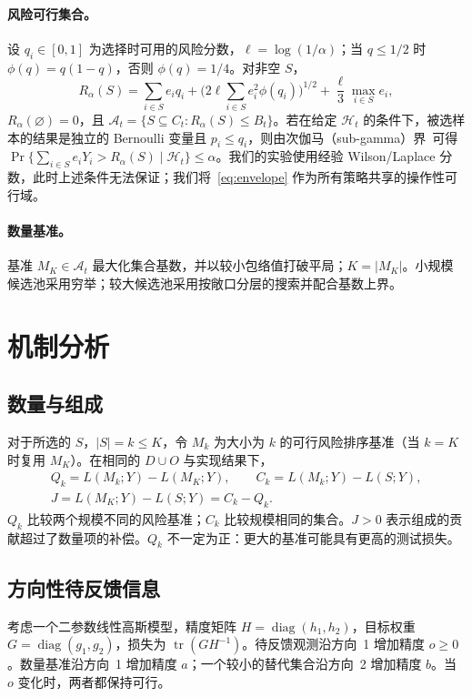 \documentclass[runningheads]{llncs}
\begin{document}
\paragraph{风险可行集合。}设 $q_i\in[0,1]$ 为选择时可用的风险分数，$\ell=\log(1/\alpha)$；当 $q\le1/2$ 时 $\phi(q)=q(1-q)$，否则 $\phi(q)=1/4$。对非空 $S$，
\begin{equation}
 R_\alpha(S)=\sum_{i\in S}e_iq_i+\Big(2\ell\sum_{i\in S}e_i^2\phi(q_i)\Big)^{1/2}+\frac{\ell}{3}\max_{i\in S}e_i,
 \label{eq:envelope}
\end{equation}
$R_\alpha(\varnothing)=0$，且 $\mathcal A_t=\{S\subseteq C_t:R_\alpha(S)\le B_t\}$。若在给定 $\mathcal H_t$ 的条件下，被选样本的结果是独立的 Bernoulli 变量且 $p_i\le q_i$，则由次伽马（sub-gamma）界~\cite{boucheron2013concentration}可得 $\Pr\{\sum_{i\in S}e_iY_i>R_\alpha(S)\mid\mathcal H_t\}\le\alpha$。我们的实验使用经验 Wilson/Laplace 分数，此时上述条件无法保证；我们将~\eqref{eq:envelope} 作为所有策略共享的操作性可行域。

\paragraph{数量基准。}基准 $M_K\in\mathcal A_t$ 最大化集合基数，并以较小包络值打破平局；$K=|M_K|$。小规模候选池采用穷举；较大候选池采用按敞口分层的搜索并配合基数上界。

\section{机制分析}
\label{sec:mechanism}
\subsection{数量与组成}
对于所选的 $S$，$|S|=k\le K$，令 $M_k$ 为大小为 $k$ 的可行风险排序基准（当 $k=K$ 时复用 $M_K$）。在相同的 $D\cup O$ 与实现结果下，
\begin{equation}
\begin{gathered}
 Q_k=L(M_k;Y)-L(M_K;Y),\qquad C_k=L(M_k;Y)-L(S;Y),\\
 J=L(M_K;Y)-L(S;Y)=C_k-Q_k.
\end{gathered}
 \label{eq:decomposition}
\end{equation}
$Q_k$ 比较两个规模不同的风险基准；$C_k$ 比较规模相同的集合。$J>0$ 表示组成的贡献超过了数量项的补偿。$Q_k$ 不一定为正：更大的基准可能具有更高的测试损失。

\subsection{方向性待反馈信息}
考虑一个二参数线性高斯模型，精度矩阵 $H=\operatorname{diag}(h_1,h_2)$，目标权重 $G=\operatorname{diag}(g_1,g_2)$，损失为 $\operatorname{tr}(GH^{-1})$。待反馈观测沿方向~1 增加精度 $o\ge0$。数量基准沿方向~1 增加精度 $a$；一个较小的替代集合沿方向~2 增加精度 $b$。当 $o$ 变化时，两者都保持可行。
\end{document}
